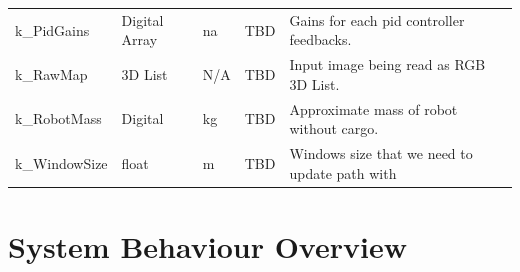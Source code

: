 \documentclass[12pt]{article}
\begin{document}
\begin{table}[H]
\begin{tabularx}{\textwidth}{|p{6cm}|p{1.5cm}|p{1.25cm}|p{1cm}|X|}
                k\_PidGains            & Digital Array & \acrshort{na} &TBD & Gains for each \acrshort{pid} controller feedbacks.                                                   \\
                k\_RawMap & 3D List &  N/A  &TBD & Input image being read as RGB 3D List.\\
                k\_RobotMass           & Digital       & \si{kg}    & TBD  & Approximate mass of robot without cargo.                                                              \\
                k\_WindowSize & float & m & TBD& Windows size that we need to update path with\\

                \bottomrule
            \end{tabularx}
        \end{table}
        
\section{System Behaviour Overview}
\end{document}
